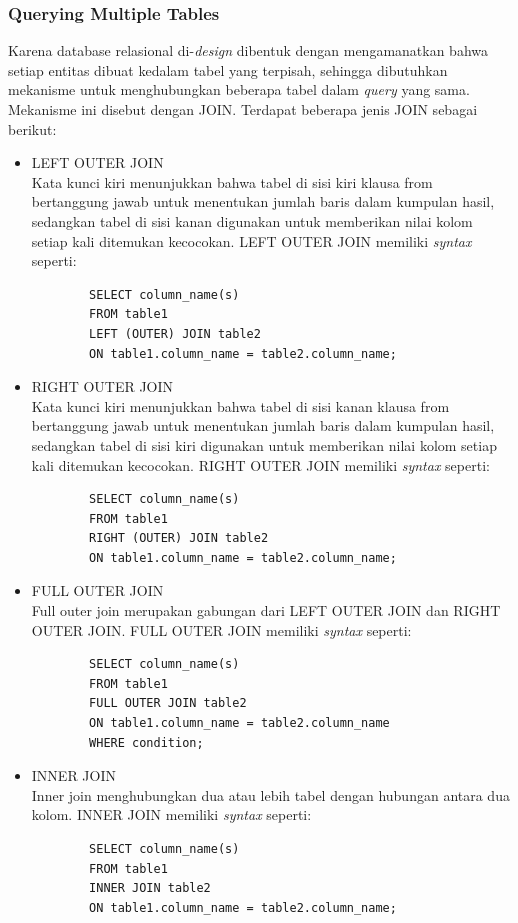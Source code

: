 \subsubsection{Querying Multiple Tables}
Karena database relasional di-\textit{design} dibentuk dengan mengamanatkan bahwa setiap entitas dibuat kedalam tabel yang terpisah, sehingga dibutuhkan mekanisme untuk menghubungkan beberapa tabel dalam \textit{query} yang sama. Mekanisme ini disebut dengan JOIN. Terdapat beberapa jenis JOIN sebagai berikut:
\begin{itemize}
    \item LEFT OUTER JOIN \\
    Kata kunci kiri menunjukkan bahwa tabel di sisi kiri klausa from bertanggung jawab untuk menentukan jumlah baris dalam kumpulan hasil, sedangkan tabel di sisi kanan digunakan untuk memberikan nilai kolom setiap kali ditemukan kecocokan. LEFT OUTER JOIN memiliki \textit{syntax} seperti:
    \begin{verbatim}
        SELECT column_name(s)
        FROM table1
        LEFT (OUTER) JOIN table2
        ON table1.column_name = table2.column_name;
    \end{verbatim}
    
    \item RIGHT OUTER JOIN \\
    Kata kunci kiri menunjukkan bahwa tabel di sisi kanan klausa from bertanggung jawab untuk menentukan jumlah baris dalam kumpulan hasil, sedangkan tabel di sisi kiri digunakan untuk memberikan nilai kolom setiap kali ditemukan kecocokan. RIGHT OUTER JOIN memiliki \textit{syntax} seperti:
    \begin{verbatim}
        SELECT column_name(s)
        FROM table1
        RIGHT (OUTER) JOIN table2
        ON table1.column_name = table2.column_name;
    \end{verbatim}
    
    \item FULL OUTER JOIN \\
    Full outer join merupakan gabungan dari LEFT OUTER JOIN dan RIGHT OUTER JOIN. FULL OUTER JOIN memiliki \textit{syntax} seperti:
    \begin{verbatim}
        SELECT column_name(s)
        FROM table1
        FULL OUTER JOIN table2
        ON table1.column_name = table2.column_name
        WHERE condition;
    \end{verbatim}
    
    \item INNER JOIN \\
    Inner join menghubungkan dua atau lebih tabel dengan hubungan antara dua kolom. INNER JOIN memiliki \textit{syntax} seperti:
    \begin{verbatim}
        SELECT column_name(s)
        FROM table1
        INNER JOIN table2
        ON table1.column_name = table2.column_name;
    \end{verbatim}
\end{itemize}

